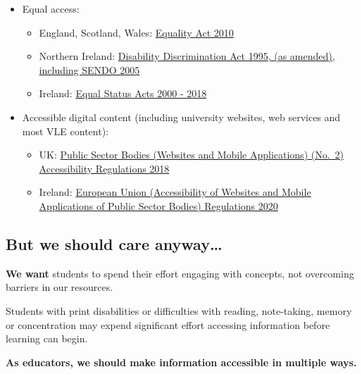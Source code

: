\documentclass[
  12pt,
  a4-paperpaper,
  DIV=11,
  numbers=noendperiod]{scrartcl}
\providecommand{\tightlist}{%
  \setlength{\itemsep}{0pt}\setlength{\parskip}{0pt}}
\begin{document}
\begin{itemize}
\tightlist
\item
  Equal access:

  \begin{itemize}
  \tightlist
  \item
    England, Scotland, Wales:
    \href{https://www.legislation.gov.uk/ukpga/2010/15/contents}{Equality
    Act 2010}
  \item
    Northern Ireland:
    \href{http://www.niassembly.gov.uk/globalassets/Documents/RaISe/Publications/2012/ofmdfm/2712.pdf}{Disability
    Discrimination Act 1995, (as amended), including SENDO 2005}
  \item
    Ireland:
    \href{https://www.ihrec.ie/app/uploads/2022/08/IHREC-Equal-Status-Rights-Leaflet-WEB.pdf}{Equal
    Status Acts 2000 - 2018}
  \end{itemize}
\item
  Accessible digital content (including university websites, web
  services and most VLE content):

  \begin{itemize}
  \tightlist
  \item
    UK:
    \href{https://www.legislation.gov.uk/uksi/2018/952/contents}{Public
    Sector Bodies (Websites and Mobile Applications) (No.~2)
    Accessibility Regulations 2018}
  \item
    Ireland:
    \href{https://www.irishstatutebook.ie/eli/2020/si/358/made/en/print}{European
    Union (Accessibility of Websites and Mobile Applications of Public
    Sector Bodies) Regulations 2020}
  \end{itemize}
\end{itemize}

\subsection{But we should care
anyway\ldots{}}\label{but-we-should-care-anyway}

\textbf{We want} students to spend their effort engaging with concepts,
not overcoming barriers in our resources.

Students with print disabilities or difficulties with reading,
note-taking, memory or concentration may expend significant effort
accessing information before learning can begin.

\textbf{As educators, we should make information accessible in multiple
ways.}
\end{document}
